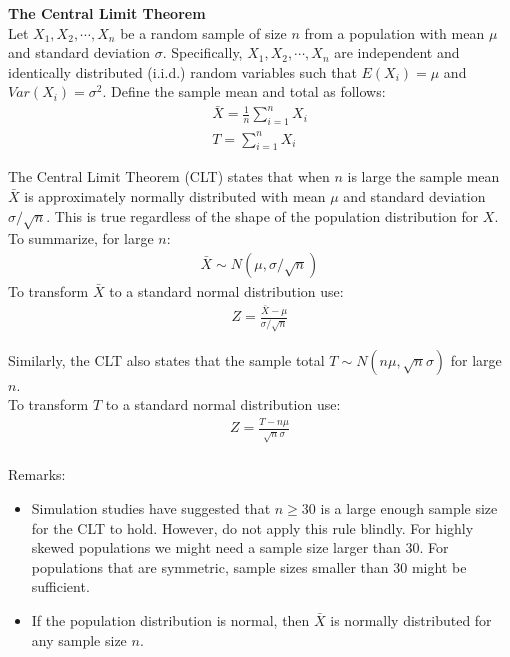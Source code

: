 \documentclass[fleqn]{article}\usepackage[]{graphicx}\usepackage[]{color}
\begin{document}
\clearpage

\textbf{The Central Limit Theorem}\\

Let $X_1, X_2, \cdots, X_n$ be a random sample of size $n$ from a population with mean $\mu$ and standard deviation $\sigma$.  Specifically, $X_1, X_2, \cdots, X_n$ are independent and identically distributed (i.i.d.) random variables such that $E(X_i) = \mu$ and $Var(X_i) = \sigma^2$.  Define the sample mean and total as follows:
\begin{align*}
\bar{X} = \frac{1}{n}\sum_{i=1}^n X_i\\
T = \sum_{i=1}^n X_i
\end{align*}

The Central Limit Theorem (CLT) states that when $n$ is large the sample mean $\bar{X}$ is approximately normally distributed with mean $\mu$ and standard deviation $\sigma / \sqrt{n}$.  This is true regardless of the shape of the population distribution for $X$.  To summarize, for large $n$: \begin{align*}
\bar{X} \sim N(\mu, \sigma / \sqrt{n})
\end{align*}
To transform $\bar{X}$ to a standard normal distribution use:
\begin{align*}
Z = \frac{\bar{X} - \mu}{\sigma / \sqrt{n}}
\end{align*}

Similarly, the CLT also states that the sample total $T \sim N(n\mu, \sqrt{n} \sigma)$ for large $n$.\\  
To transform $T$ to a standard normal distribution use: 
\begin{align*}
Z = \frac{T - n\mu}{\sqrt{n} \sigma}\\
\end{align*}  

Remarks:
\begin{itemize}
\item Simulation studies have suggested that $n \geq 30$ is a large enough sample size for the CLT to hold.  However, do not apply this rule blindly.  For highly skewed populations we might need a sample size larger than 30.  For populations that are symmetric, sample sizes smaller than 30 might be sufficient.
\item If the population distribution is normal, then $\bar{X}$ is normally distributed for any sample size $n$.
\end{itemize}

\clearpage
\end{document}
